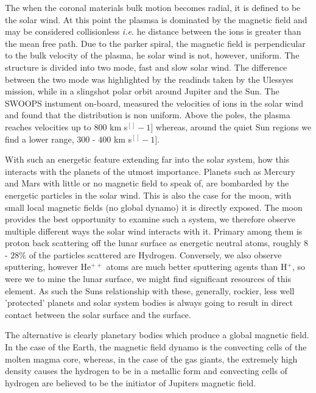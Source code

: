 The when the coronal materials bulk motion becomes radial, it is defined to be the solar wind.
At this point the plasmsa is dominated by the magnetic field and may be considered collisionless \emph{i.e.} he distance between the ions is greater than the mean free path.
Due to the parker spiral, the magnetic field is perpendicular to the bulk velocity of the plasma, he solar wind is not, however, uniform.
The structure is divided into two mode, fast and slow solar wind. 
The difference between the two mode was highlighted by the readinds taken by the Ulessyes mission, while in a slingshot polar orbit around Jupiter and the Sun.
The SWOOPS instument on-board, measured the velocities of ions in the solar wind and found that the distribution is non uniform.
Above the poles, the plasma reaches velocities up to $800$ km s${^[]-1]}$ whereas, around the quiet Sun regions we find a lower range, $300$ - $400$ km s${^[]-1]}$.

With such an energetic feature extending far into the solar system, how this interacts with the planets of the utmost importance.
Planets such as Mercury and Mars with little or no magnetic field to speak of, are bombarded by the energetic particles in the solar wind.
This is also the case for the moon, with small local magnetic fields (no global dynamo) it is directly exposed.
The moon provides the best opportunity to examine such a system, we therefore observe multiple different ways the solar wind interacts with it.
Primary among them is proton back scattering off the lunar surface as energetic neutral atoms, roughly $8$ - $28\%$ of the particles scattered are Hydrogen.
Conversely, we also observe sputtering, however He$^{++}$ atoms are much better sputtering agents than H$^{+}$, so were we to mine the lunar surface, we might find significant resources of this element. 
As such the Suns relationship with these, generally, rockier, less well 'protected' planets and solar system bodies is always going to result in direct contact between the solar surface and the surface.

The alternative is clearly planetary bodies which produce a global magnetic field.
In the case of the Earth, the magnetic field dynamo is the convecting cells of the molten magma core, whereas, in the case of the gas giants, the extremely high density causes the hydrogen to be in a metallic form and convecting cells of hydrogen are believed to be the initiator of Jupiters magnetic field.

